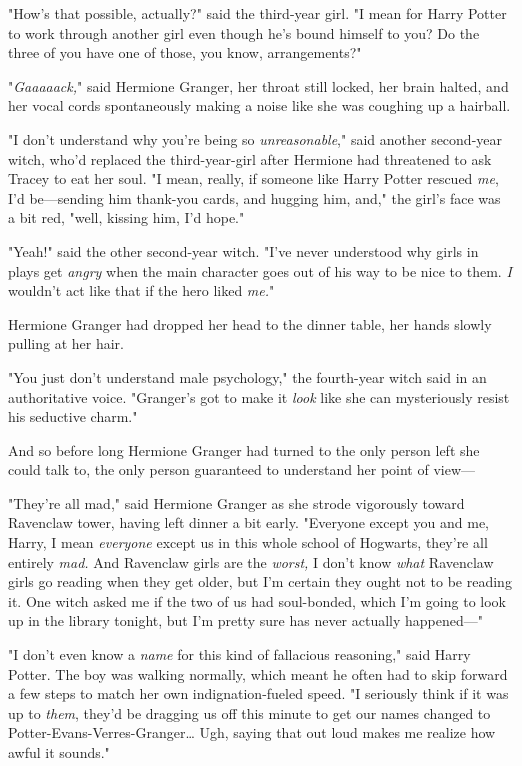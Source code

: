 "How's that possible, actually?" said the third-year girl. "I mean for Harry
Potter to work through another girl even though he's bound himself to you? Do
the three of you have one of those, you know, arrangements?"

"\emph{Gaaaaack,}" said Hermione Granger, her throat still locked, her brain
halted, and her vocal cords spontaneously making a noise like she was coughing
up a hairball.

"I don't understand why you're being so \emph{unreasonable}," said another
second-year witch, who'd replaced the third-year-girl after Hermione had
threatened to ask Tracey to eat her soul. "I mean, really, if someone like
Harry Potter rescued \emph{me}, I'd be---sending him thank-you cards, and
hugging him, and," the girl's face was a bit red, "well, kissing him, I'd hope."

"Yeah!" said the other second-year witch. "I've never understood why girls in
plays get \emph{angry} when the main character goes out of his way to be nice
to them. \emph{I} wouldn't act like that if the hero liked \emph{me.}"

Hermione Granger had dropped her head to the dinner table, her hands slowly
pulling at her hair.

"You just don't understand male psychology," the fourth-year witch said in an
authoritative voice. "Granger's got to make it \emph{look} like she can
mysteriously resist his seductive charm."

And so before long Hermione Granger had turned to the only person left she
could talk to, the only person guaranteed to understand her point of view---

"They're all mad," said Hermione Granger as she strode vigorously toward
Ravenclaw tower, having left dinner a bit early. "Everyone except you and me,
Harry, I mean \emph{everyone} except us in this whole school of Hogwarts,
they're all entirely \emph{mad.} And Ravenclaw girls are the \emph{worst,} I
don't know \emph{what} Ravenclaw girls go reading when they get older, but I'm
certain they ought not to be reading it. One witch asked me if the two of us
had soul-bonded, which I'm going to look up in the library tonight, but I'm
pretty sure has never actually happened---"

"I don't even know a \emph{name} for this kind of fallacious reasoning," said
Harry Potter. The boy was walking normally, which meant he often had to skip
forward a few steps to match her own indignation-fueled speed. "I seriously
think if it was up to \emph{them}, they'd be dragging us off this minute to get
our names changed to Potter-Evans-Verres-Granger{\ldots} Ugh, saying that out
loud makes me realize how awful it sounds."

